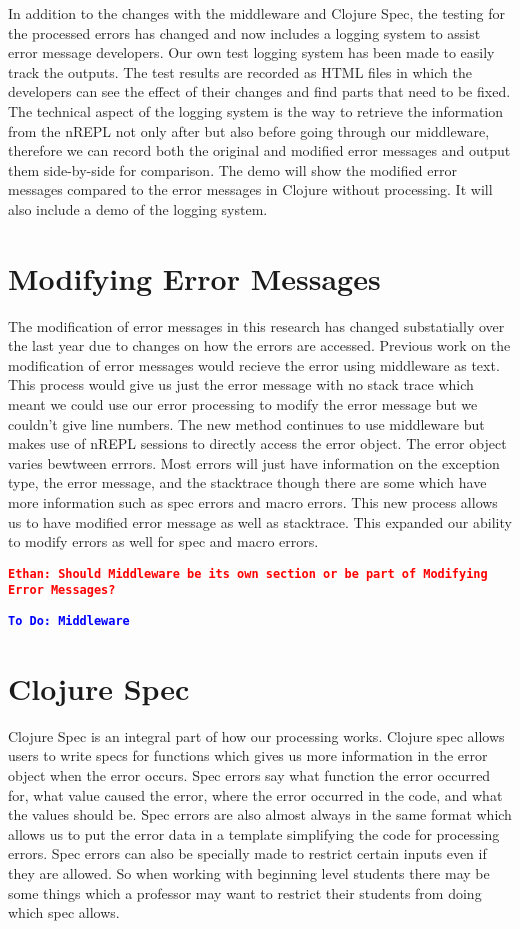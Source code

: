 \documentclass[12pt]{article}
\newcommand{\comment}[1]{{\bf \tt  {#1}}}
\newcommand{\eucomment}[1]{\textcolor{red}{\comment{Ethan: {#1}}}}
\newcommand{\todo}[1]{\textcolor{blue}{\comment{To Do: {#1}}}}
\begin{document}
In addition to the changes with the middleware and Clojure Spec, the testing for the processed errors has changed and now includes a logging system to assist error message developers. Our own test logging system has been made to easily track the outputs. The test results are recorded as HTML files in which the developers can see the effect of their changes and find parts that need to be fixed. The technical aspect of the logging system is the way to retrieve the information from the nREPL not only after but also before going through our middleware, therefore we can record both the original and modified error messages and output them side-by-side for comparison.
The demo will show the modified error messages compared to the error messages in Clojure without processing. It will also include a demo of the logging system.

\section{Modifying Error Messages}
The modification of error messages in this research has changed substatially over the last year due to changes on how the errors are accessed. 
Previous work on the modification of error messages would recieve the error using middleware as text.
This process would give us just the error message with no stack trace which meant we could use our error processing to modify the error message but we couldn't give line numbers.
The new method continues to use middleware but makes use of nREPL sessions to directly access the error object.
The error object varies bewtween errrors. 
Most errors will just have information on the exception type, the error message, and the stacktrace though there are some which have more information such as spec errors and macro errors.
This new process allows us to have modified error message as well as stacktrace.
This expanded our ability to modify errors as well for spec and macro errors.

\eucomment{Should Middleware be its own section or be part of Modifying Error Messages?}

\todo{Middleware}


\section{Clojure Spec}
Clojure Spec is an integral part of how our processing works. 
Clojure spec allows users to write specs for functions which gives us more information in the error object when the error occurs. 
Spec errors say what function the error occurred for, what value caused the error, where the error occurred in the code, and what the values should be. 
Spec errors are also almost always in the same format which allows us to put the error data in a template simplifying the code for processing errors. 
Spec errors can also be specially made to restrict certain inputs even if they are allowed. 
So when working with beginning level students there may be some things which a professor may want to restrict their students from doing which spec allows.
\end{document}
